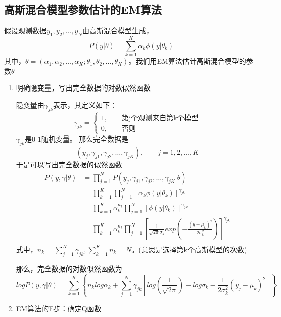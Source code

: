 \subsection*{高斯混合模型参数估计的EM算法}
假设观测数据$y_1,y_2,\dots,y_N$由高斯混合模型生成，
\begin{equation}
	P(y|\theta)=\sum_{k=1}^{K}\alpha_k\phi(y|\theta_k)
\end{equation}
其中，$\theta=(\alpha_1,\alpha_2,\dots,\alpha_K;\theta_1,\theta_2,\dots,\theta_K)$。我们用EM算法估计高斯混合模型的参数$\theta$
\begin{enumerate}
	\item 明确隐变量，写出完全数据的对数似然函数
	
	隐变量由$\gamma_{jk}$表示，其定义如下：
	\begin{equation}
		\gamma_{jk}=\begin{cases}
		1,\qquad \text{第j个观测来自第k个模型}\\0,\qquad \text{否则}
		\end{cases}
	\end{equation}
	$\gamma_{jk}$是0-1随机变量。
	那么完全数据是
	\begin{equation*}
		(y_j,\gamma_{j1},\gamma_{j2},\dots,\gamma_{jK}),\qquad j=1,2,\dots,K
	\end{equation*}
	于是可以写出完全数据的似然函数
	\begin{equation*}
		\begin{aligned}
			P(y,\gamma|\theta)&=\prod_{j=1}^{N}P(y_j,\gamma_{j1},\gamma_{j2},\dots,\gamma_{jK}|\theta)\\
			&=\prod_{k=1}^{K}\prod_{j=1}^{N}\left[\alpha_k\phi(y|\theta_k)\right]^{\gamma_{jk}}\\
			&=\prod_{k=1}^{K}\alpha_k^{n_k}\prod_{j=1}^{N}\left[\phi(y|\theta_k)\right]^{\gamma_{jk}}\\
			&=\prod_{k=1}^{K}\alpha_k^{n_k}\prod_{j=1}^{N}\left[ \frac{1}{\sqrt{2\pi}\sigma_k}exp\left(-\frac{(y-\mu_k)^2}{2\sigma_k^2}\right) \right]^{\gamma_{jk}}\\
		\end{aligned}
	\end{equation*}
	式中，$n_k=\sum\limits_{j=1}^{N}\gamma_{jk},\sum\limits_{k=1}^{K}n_{k}=N$。(意思是选择第k个高斯模型的次数)
	
	那么，完全数据的对数似然函数为
	\begin{equation*}
		log P(y,\gamma|\theta)=\sum_{k=1}^{K}\left\{n_klog\alpha_k+\sum_{j=1}^{N}\gamma_{jk}\left[log\left(\frac{1}{\sqrt{2\pi}}\right)-log\sigma_k-\frac{1}{2\sigma_k^2}(y_j-\mu_k)^2\right] \right\}
	\end{equation*}
	\item EM算法的E步：确定Q函数
	

\end{enumerate}
